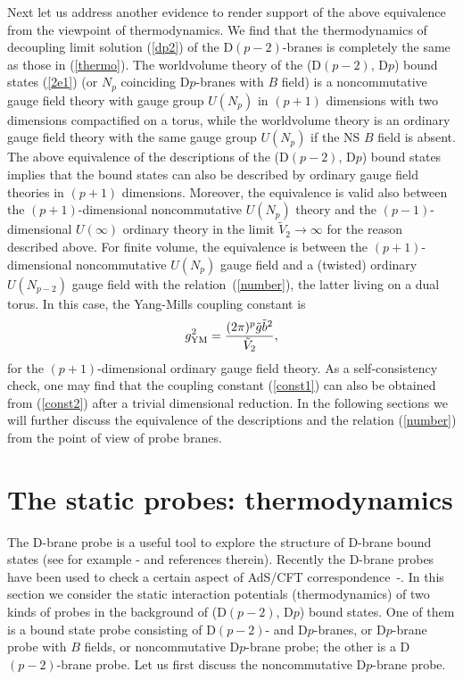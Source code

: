 \documentclass[a4paper,12pt]{article}
\newcommand{\sect}[1]{\setcounter{equation}{0}\section{#1}}
\begin{document}
Next let us address another evidence to render support of the above
equivalence from the viewpoint of thermodynamics. We find that the
thermodynamics of decoupling limit solution (\ref{dp2}) of the D$(p-2)$-branes
is completely the same as those in (\ref{thermo}). The worldvolume theory of
the (D$(p-2)$, D$p$) bound states (\ref{2e1}) (or $N_p$ coinciding D$p$-branes
with $B$ field) is a noncommutative gauge field theory with gauge group
$U(N_p)$ in $(p+1)$ dimensions with two dimensions compactified on a torus,
while the worldvolume theory is an ordinary gauge field theory with the
same gauge group $U(N_p)$ if the NS $B$ field is absent. The above
equivalence of the descriptions of the (D$(p-2)$, D$p$) bound states
implies that the bound states can also be described by ordinary gauge field
theories in $(p+1)$ dimensions. Moreover, the equivalence is valid also
between the $(p+1)$-dimensional noncommutative $U(N_p)$ theory and the
$(p-1)$-dimensional $U(\infty)$ ordinary theory in the limit ${\tilde V}_2
\to \infty$ for the reason described above. For finite volume, the
equivalence is between the $(p+1)$-dimensional noncommutative $U(N_p)$ gauge
field and a (twisted) ordinary $U(N_{p-2})$ gauge field with the
relation~(\ref{number}), the latter living on a dual torus. In this case,
the Yang-Mills coupling constant is
\begin{equation}
\label{const2}
g^2_{\rm YM}=\frac{(2\pi)^p \tilde{g}\tilde{b}^2}{\tilde{V}_2},
\end{equation}
for the $(p+1)$-dimensional ordinary gauge field theory. As a self-consistency
check, one may find that the coupling constant (\ref{const1}) can also be
obtained from (\ref{const2}) after a trivial dimensional reduction. In the
following sections we will further discuss the equivalence of the descriptions
and the relation (\ref{number}) from the point of view of probe branes.


\sect{The static probes: thermodynamics}

The D-brane probe is a useful tool to explore the structure of D-brane
bound states (see for example \cite{Dou}-\cite{Youm} and references
therein). Recently the D-brane probes have been used to check a certain
aspect of AdS/CFT correspondence~\cite{AA}-\cite{Cai}. In this section
we consider the static interaction potentials (thermodynamics) of two
kinds of probes in the background of (D$(p-2)$, D$p$) bound states.
One of them is a bound state probe consisting of D$(p-2)$- and D$p$-branes,
or D$p$-brane probe with $B$ fields, or noncommutative D$p$-brane probe;
the other is a D$(p-2)$-brane probe.
Let us first discuss the noncommutative D$p$-brane probe.
\end{document}
